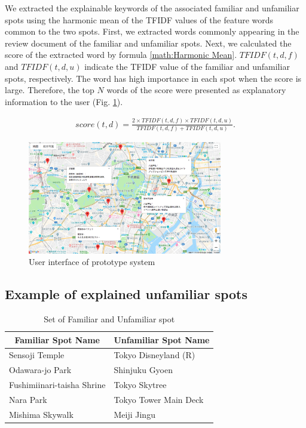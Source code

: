 \documentclass[journal]{IAENGtran}
\begin{document}
   We extracted the explainable keywords of the associated familiar and unfamiliar spots using the harmonic mean of the TFIDF values of the feature words common to the two spots. First, we extracted words commonly appearing in the review document of the familiar and unfamiliar spots. Next, we calculated the score of the extracted word by formula \ref{math:Harmonic Mean}. $TFIDF(t,d,f)$ and $TFIDF(t,d,u)$ indicate the TFIDF value of the familiar and unfamiliar spots, respectively. The word has high importance in each spot when the score is large. Therefore, the top $N$ words of the score were presented as explanatory information to the user (Fig. \ref{fig:photo_map}).

\begin{eqnarray}
  score(t,d) = \frac{2 \times TFIDF(t,d,f) \times TFIDF(t,d,u)}{TFIDF(t,d,f) + TFIDF(t,d,u)}.
  \label{math:Harmonic Mean}
\end{eqnarray}

\begin{figure}[t]
  \begin{center}
    \includegraphics[clip,width=8.5cm,bb=0 0 1289 750]{picture/Photo_Map.png}
    \caption{User interface of prototype system}
    \label{fig:photo_map}
   \end{center}
\end{figure}

\subsection{Example of explained unfamiliar spots}
\label{subsec:Example of explained unfamiliar spots}

\begin{table}[t]
  \caption{Set of Familiar and Unfamiliar spot}
  \label{table:Familiar spot group and Unfamiliar spot group}
  \centering
  \begin{tabular}{l|l}
  \hline
  \multicolumn{1}{c|}{Familiar Spot Name} & \multicolumn{1}{c}{Unfamiliar Spot Name} \\ \hline
  Sensoji Temple                          & Tokyo Disneyland (R)                     \\
  Odawara-jo Park                         & Shinjuku Gyoen                           \\
  Fushimiinari-taisha Shrine              & Tokyo Skytree                            \\
  Nara Park                               & Tokyo Tower Main Deck            \\
  Mishima Skywalk                         & Meiji Jingu                              \\ \hline
  \end{tabular}
\end{table}
\end{document}
